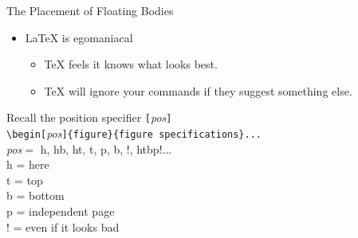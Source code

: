 \documentclass[landscape]{slides}
\begin{document}
\begin{normalsize}
\begin{slide}
\end{slide}


\begin{slide}
\begin{center}
{\Huge The Placement of Floating Bodies}
\end {center}
\end{slide}


\begin{slide}
\begin{itemize}
\item \LaTeX{} is egomaniacal
\begin{itemize}
\item \TeX{} feels it knows what looks best.
\item \TeX{} will ignore your commands if they suggest something else.
\end{itemize}
\end{itemize}
\end{slide}


\begin{slide}
\begin{center}
Recall the position specifier \verb+[+\emph{pos}\verb+]+
\vspace{1cm}\\
\verb+\begin[+\emph{pos}\verb+]{figure}{figure specifications}...+
\vspace{1cm}\\
\emph{pos}$ = $ h, hb, ht, t, p, b, !, htbp!...
\vspace{1cm}\\
h = here\\
t = top\\
b = bottom\\
p = independent page\\
! = even if it looks bad\\
\end{center}
\end{slide}



\end{normalsize}
\end{document}
